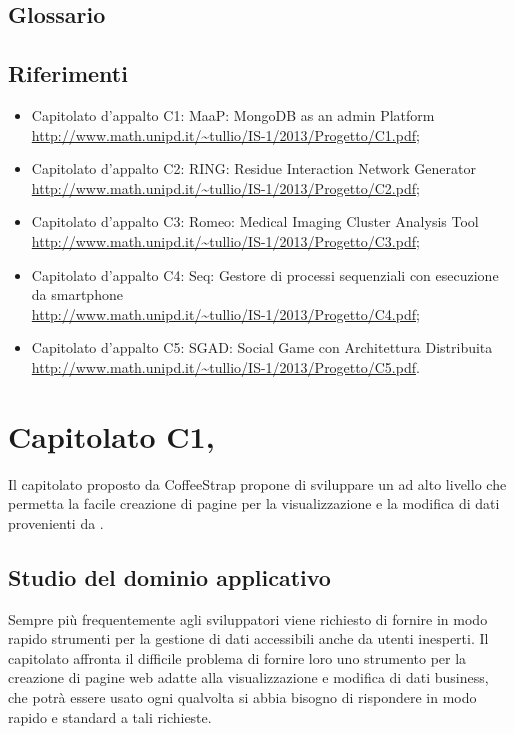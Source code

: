 \subsection{Glossario}%
\label{1.2}
\Glossario{}

\subsection{Riferimenti} %
\label{1.3}

\begin{itemize}
\item Capitolato d'appalto C1: MaaP: MongoDB as an admin Platform\\
\url{http://www.math.unipd.it/~tullio/IS-1/2013/Progetto/C1.pdf};
\item Capitolato d'appalto C2: RING: Residue Interaction Network Generator\\
\url{http://www.math.unipd.it/~tullio/IS-1/2013/Progetto/C2.pdf};
\item Capitolato d'appalto C3: Romeo: Medical Imaging Cluster Analysis Tool\\
\url{http://www.math.unipd.it/~tullio/IS-1/2013/Progetto/C3.pdf};
\item Capitolato d'appalto C4: Seq: Gestore di processi sequenziali con esecuzione da smartphone\\
\url{http://www.math.unipd.it/~tullio/IS-1/2013/Progetto/C4.pdf};
\item Capitolato d'appalto C5: SGAD: Social Game con Architettura Distribuita\\
\url{http://www.math.unipd.it/~tullio/IS-1/2013/Progetto/C5.pdf}.
\end{itemize}

\newpage
\section{Capitolato C1, \Progetto{}}%
\label{2}
Il capitolato proposto da CoffeeStrap propone di sviluppare un  ad alto livello che permetta la facile creazione di pagine  per la visualizzazione e la modifica di dati provenienti da .
\subsection{Studio del dominio applicativo} %
\label{2.1}
Sempre più frequentemente agli sviluppatori viene richiesto di fornire in modo rapido strumenti per la gestione di dati  accessibili anche da utenti inesperti.
Il capitolato affronta il difficile problema di fornire loro uno strumento per la creazione di pagine web adatte alla visualizzazione e modifica di dati business, che potrà essere usato ogni qualvolta si abbia bisogno di rispondere in modo rapido e standard a tali richieste.
